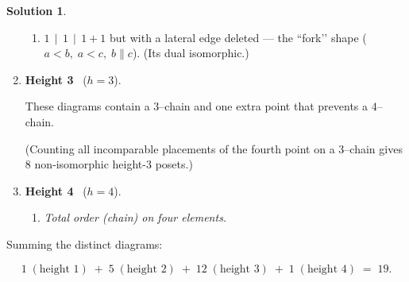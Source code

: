 \documentclass[12pt]{article}
\theoremstyle{definition} %
\newtheorem{solution}{Solution}
\theoremstyle{plain} %
\begin{document}
\begin{solution}
\begin{enumerate}[label=\textbf{\arabic*.},leftmargin=2.3em]
\begin{enumerate}[label*=\arabic*.]
      \item \(1\,\mid\,1\,\mid\,1+1\) but with a lateral edge deleted —
            the “fork’’ shape  
            (\(a<b,\;a<c,\;b\parallel c\)).  (Its dual isomorphic.)  
      \end{enumerate}

\item \textbf{Height 3} \ (\(h=3\)).  

      These diagrams contain a $3$–chain and one extra point that
      prevents a $4$–chain.


      (Counting all incomparable placements of the fourth point on a
      $3$–chain gives 8 non‐isomorphic height-3 posets.)

\item \textbf{Height 4} \ (\(h=4\)).  

      \begin{enumerate}[label*=\arabic*.]
      \item \emph{Total order (chain) on four elements.}
      \end{enumerate}

\end{enumerate}

\bigskip
Summing the distinct diagrams:

\[
   1\;(\text{height 1})
   \;+\;
   5\;(\text{height 2})
   \;+\;
   12\;(\text{height 3})
   \;+\;
   1\;(\text{height 4})
   \;=\;
   19.
\]


\end{solution}
\end{document}
